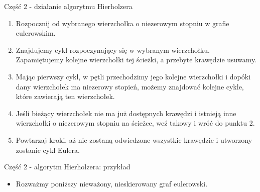 \documentclass[polish,envcountsect,10pt]{beamer}
\begin{document}
\begin{frame}{Część 2 - działanie algorytmu Hierholzera}
    \begin{enumerate}
        \item Rozpocznij od wybranego wierzchołka o niezerowym stopniu w grafie eulerowskim.
        \item Znajdujemy cykl rozpoczynający się w wybranym wierzchołku. Zapamiętujemy kolejne wierzchołki tej ścieżki, a przebyte krawędzie usuwamy.
        \item Mając pierwszy cykl, w pętli przechodzimy jego kolejne wierzchołki i dopóki dany wierzchołek ma niezerowy stopień, możemy znajdować kolejne cykle, które zawierają ten wierzchołek.
        \item Jeśli bieżący wierzchołek nie ma już dostępnych krawędzi i istnieją inne wierzchołki o niezerowym stopniu na ścieżce, weź takowy i wróć do punktu 2.
        \item Powtarzaj kroki, aż nie zostaną odwiedzone wszystkie krawędzie i utworzony zostanie cykl Eulera.
    \end{enumerate}
\end{frame}

\begin{frame}{Część 2 - algorytm Hierholzera: przykład}
    \begin{itemize}
        \item Rozważmy poniższy nieważony, nieskierowany graf eulerowski.
    \end{itemize}
    \begin{center}
    \end{center}
\end{frame}
\end{document}
